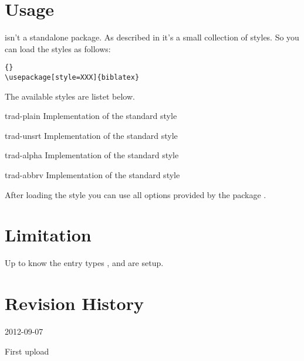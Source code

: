 \documentclass{ltxdockit}[2011/03/25]
\begin{document}
\section{Usage}

 isn't a standalone package. As described in  it's
a small collection of styles. So you can load the styles as follows:

\begin{lstlisting}[style=latex]{}
\usepackage[style=XXX]{biblatex}
\end{lstlisting}
The available styles are listet below.
\begin{marglist}

\item[trad-plain] Implementation of the standard style 
\item[trad-unsrt] Implementation of the standard style 
\item[trad-alpha] \BiberOnlyMark  Implementation of the standard style 
\item[trad-abbrv]  Implementation of the standard style 

\end{marglist}

After loading the style you can use all options provided by the package .

\section{Limitation}

Up to know the entry types ,  and  are
setup.

\section{Revision History}
\label{apx:log}

\begin{changelog}

\begin{release}{0.1}{2012-09-07}
\item First upload
\end{release}

\end{changelog}
\end{document}
